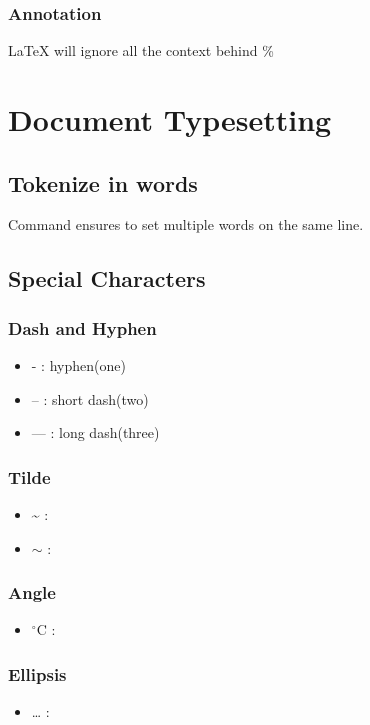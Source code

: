 \documentclass{article}
\begin{document}
\subsubsection{Annotation}
\LaTeX{} will ignore all the context
behind \%

\section{Document Typesetting}
\subsection{Tokenize in words}
Command  
ensures to set multiple words on the same line.
\subsection{Special Characters}

\subsubsection{Dash and Hyphen}
\begin{itemize}
    \item -  : hyphen(one)
    \item -- :  short dash(two)
    \item --- : long dash(three)
\end{itemize}

\subsubsection{Tilde}
\begin{itemize}
    \item \~{} : \framebox{$\backslash$ \~{}}
    \item $\sim$ : 
\end{itemize}

\subsubsection{Angle}
\begin{itemize}
    \item $^{\circ}\mathrm{C}$ : 
\end{itemize}

\subsubsection{Ellipsis}
\begin{itemize}
    \item \ldots{} :  
\end{itemize}
\end{document}
